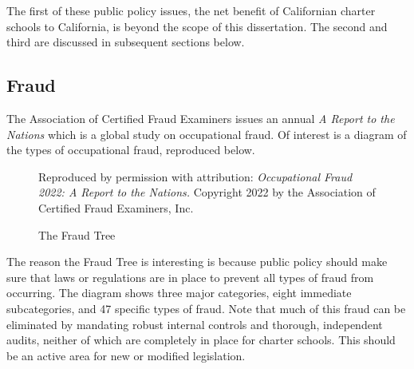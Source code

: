 The first of these public policy issues, the net benefit of Californian charter schools to California, is beyond the scope of this dissertation. The second and third are discussed in subsequent sections below.

\subsection{Fraud}%
\label{sec:fraud}\indent%

The Association of Certified Fraud Examiners issues an annual \textit{A Report to the Nations} which is a global study on occupational fraud. Of interest is a diagram of the types of occupational fraud, reproduced below.
\begin{figure}[t]
  \caption{The Fraud Tree}%
  \label{fig:fraud-tree}\centering%
    {Reproduced by permission with attribution: \textit{Occupational Fraud 2022: A Report to the Nations.} Copyright 2022 by the Association of Certified Fraud Examiners, Inc.}
  \end{figure}
  The reason the Fraud Tree is interesting is because public policy should make sure that laws or regulations are in place to prevent all types of fraud from occurring. The diagram shows three major categories, eight immediate subcategories, and 47 specific types of fraud. Note that much of this fraud can be eliminated by mandating robust internal controls and thorough, independent audits, neither of which are completely in place for charter schools. This should be an active area for new or modified legislation.

